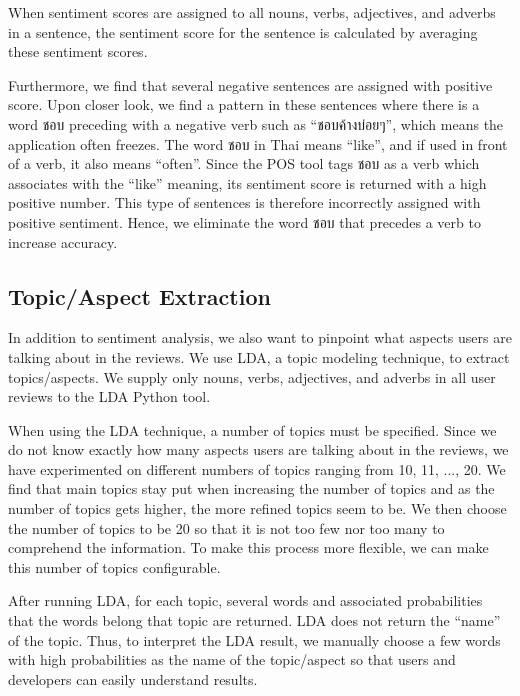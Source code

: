 When sentiment scores are assigned to all nouns, verbs, adjectives, and adverbs in a sentence, the sentiment score for the sentence is calculated by averaging these sentiment scores. 

Furthermore, we find that several negative sentences are assigned with positive score. Upon closer look, we find a pattern in these sentences where there is a word {ชอบ} preceding with a negative verb such as \enquote{{ชอบค้างบ่อยๆ}}, which means the application often freezes. The word {ชอบ} in Thai means \enquote{like}, and if used in front of a verb, it also means \enquote{often}. Since the POS tool tags {ชอบ} as a verb which associates with the \enquote{like} meaning, its sentiment score is returned with a high positive number. This type of sentences is therefore incorrectly assigned with positive sentiment. Hence, we eliminate the word {ชอบ} that precedes a verb to increase accuracy.

\subsection{Topic/Aspect Extraction}
In addition to sentiment analysis, we also want to pinpoint what aspects users are talking about in the reviews. We use LDA, a topic modeling technique, to extract topics/aspects. We supply only nouns, verbs, adjectives, and adverbs in all user reviews to the LDA Python tool. 

When using the LDA technique, a number of topics must be specified. Since we do not know exactly how many aspects users are talking about in the reviews, we have experimented on different numbers of topics ranging from 10, 11, ..., 20. We find that main topics stay put when increasing the number of topics and as the number of topics gets higher, the more refined topics seem to be. We then choose the number of topics to be 20 so that it is not too few nor too many to comprehend the information. To make this process more flexible, we can make this number of topics configurable.

After running LDA, for each topic, several words and associated probabilities that the words belong that topic are returned. LDA does not return the \enquote{name} of the topic. Thus, to interpret the LDA result, we manually choose a few words with high probabilities as the name of the topic/aspect so that users and developers can easily understand results.

